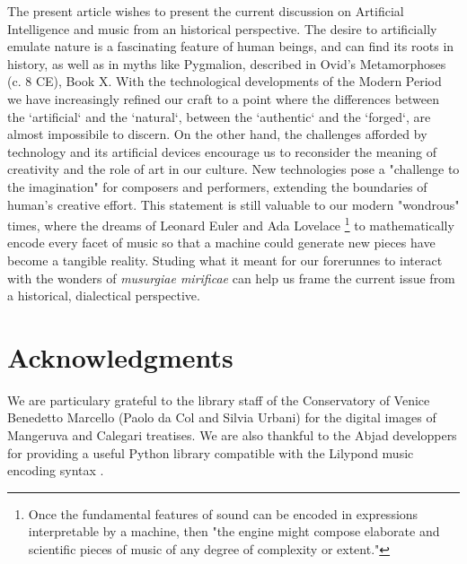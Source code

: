 \documentclass{article}
\begin{document}
The present article wishes to present the current discussion on Artificial Intelligence and music from an historical perspective. The desire to artificially emulate nature is a fascinating feature of human beings, and can find its roots in history, as well as in myths like Pygmalion, described in Ovid's Metamorphoses (c. 8 CE), Book X. \cite[p. 128-148]{ovidmethapores1997} With the technological developments of the Modern Period we have increasingly refined our craft to a point where the differences between the `artificial` and the `natural`, between the `authentic` and the `forged`, are almost impossibile to discern. \cite{battin1979exact}
On the other hand, the challenges afforded by technology and its artificial devices encourage us to reconsider the meaning of creativity and the role of art in our culture. \cite{colton2012computational}
New technologies pose a "challenge to the imagination"  for composers and performers, \cite{lincoln2019computer} extending the boundaries of human's creative effort. This statement is still valuable to our modern "wondrous" times, where the dreams of Leonard Euler \cite{grant2013leonhard} and Ada Lovelace \footnote{Once the fundamental features of sound can be encoded in expressions interpretable by a machine, then "the engine might compose elaborate and scientific pieces of music of any degree of complexity or extent."} \cite{bowles1970musicke} to mathematically encode every facet of music so that a machine could generate new pieces have become a tangible reality. Studing what it meant for our forerunnes to interact with the wonders of \textit{musurgiae mirificae} can help us frame the current issue from a historical, dialectical perspective.

\section{Acknowledgments}

We are particulary grateful to the library staff of the Conservatory of Venice Benedetto Marcello (Paolo da Col and Silvia Urbani) for the digital images of Mangeruva and Calegari treatises. We are also thankful to the Abjad developpers for providing a useful Python library compatible with the Lilypond music encoding syntax \cite{baca2015abjad}.




\end{document}
